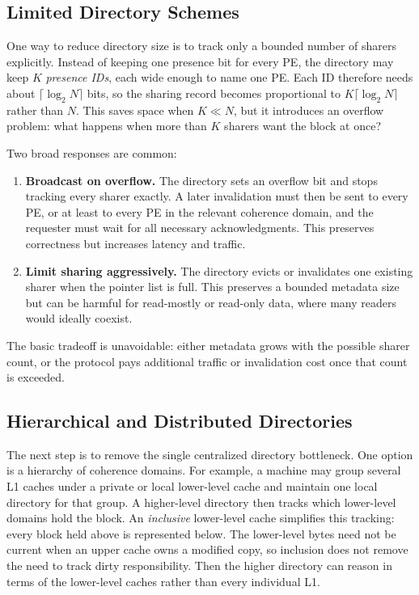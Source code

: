 \subsection*{Limited Directory Schemes}
One way to reduce directory size is to track only a bounded number of sharers explicitly.
Instead of keeping one presence bit for every PE, the directory may keep $K$ \textit{presence IDs}, each wide enough to name one PE\@.
Each ID therefore needs about $\lceil \log_2 N\rceil$ bits, so the sharing record becomes proportional to $K\lceil \log_2 N\rceil$ rather than $N$.
This saves space when $K\ll N$, but it introduces an overflow problem: what happens when more than $K$ sharers want the block at once?

Two broad responses are common:
\begin{enumerate}
    \item \textbf{Broadcast on overflow.}
    The directory sets an overflow bit and stops tracking every sharer exactly.
    A later invalidation must then be sent to every PE, or at least to every PE in the relevant coherence domain, and the requester must wait for all necessary acknowledgments.
    This preserves correctness but increases latency and traffic.
    \item \textbf{Limit sharing aggressively.}
    The directory evicts or invalidates one existing sharer when the pointer list is full.
    This preserves a bounded metadata size but can be harmful for read-mostly or read-only data, where many readers would ideally coexist.
\end{enumerate}
The basic tradeoff is unavoidable: either metadata grows with the possible sharer count, or the protocol pays additional traffic or invalidation cost once that count is exceeded.

\subsection*{Hierarchical and Distributed Directories}
The next step is to remove the single centralized directory bottleneck.
One option is a hierarchy of coherence domains.
For example, a machine may group several L1 caches under a private or local lower-level cache and maintain one local directory for that group.
A higher-level directory then tracks which lower-level domains hold the block.
An \textit{inclusive} lower-level cache simplifies this tracking: every block held above is represented below.
The lower-level bytes need not be current when an upper cache owns a modified copy, so inclusion does not remove the need to track dirty responsibility.
Then the higher directory can reason in terms of the lower-level caches rather than every individual L1.

